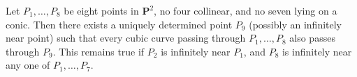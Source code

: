Let $P_1, \ldots, P_8$ be eight points in $\mathbf{P}^2$, no four collinear, and no seven lying on a conic. Then there exists a uniquely determined point $P_9$ (possibly an infinitely near point) such that every cubic curve passing through $P_1, \ldots, P_8$ also passes through $P_9$. This remains true if $P_2$ is infinitely near $P_1$, and $P_8$ is infinitely near any one of $P_1, \ldots, P_7$.
